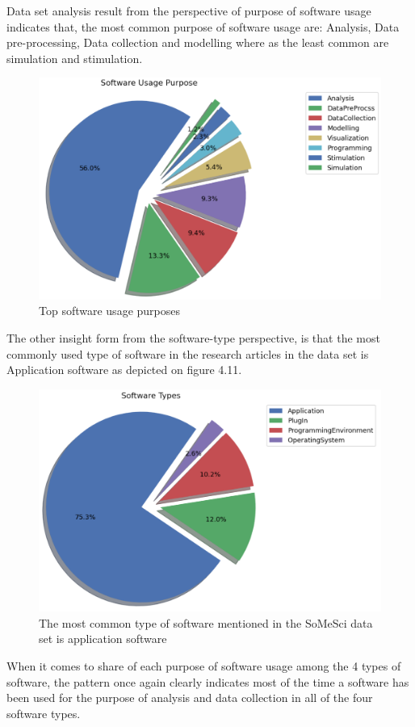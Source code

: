 Data set analysis result from the perspective of purpose of software usage indicates that, the most common purpose of software usage are: Analysis, Data pre-processing, Data collection and modelling where as the least common are simulation and stimulation. 

\begin{figure}[htbp]
	\centering
	\includegraphics[width=.55\textwidth]{4.graphics/figures/analysisresults/2.Software Usage Purpose pie}
	\caption{Top software usage purposes}
	\label{fig:chapter03:setup}
\end{figure}


The other insight form from  the software-type perspective, is that the most commonly used type of software in the research articles in the data set is Application software as depicted on figure 4.11. \\


\begin{figure}[htbp]
	\centering
	\includegraphics[width=.68\textwidth]{4.graphics/figures/analysisresults/4.Software Types pie}
	\caption{The most common type of software mentioned in the \ac{SoMeSci} data set is application software }
	\label{fig:chapter03:setup}
\end{figure}

When it comes to share of each purpose of software usage among the 4 types of software, the pattern once again clearly indicates most of the time a software has been used for the purpose of analysis and data collection in all of the four software types. 

